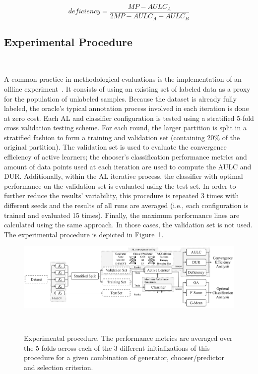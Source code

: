 \documentclass[parskip=full]{scrartcl}
\begin{document}
\begin{equation}
    deficiency = \frac{MP-AULC_A}{2MP-AULC_A-AULC_B} 
\end{equation}

\subsection{Experimental Procedure}~\label{sec:experimental_procedure}

A common practice in methodological evaluations is the implementation of an
offline experiment~\cite{Kagy2019}. It consists of using an existing set of
labeled data as a proxy for the population of unlabeled samples. Because the
dataset is already fully labeled, the oracle's typical annotation process
involved in each iteration is done at zero cost. Each AL and classifier
configuration is tested using a stratified 5-fold cross validation testing
scheme. For each round, the larger partition is split in a stratified fashion to
form a training and validation set (containing 20\% of the original partition).
The validation set is used to evaluate the convergence efficiency of active
learners; the chooser's classification performance metrics and amount of data
points used at each iteration are used to compute the AULC and DUR\@.
Additionally, within the AL iterative process, the classifier with optimal
performance on the validation set is evaluated using the test set. In order to
further reduce the results' variability, this procedure is repeated 3 times with
different seeds and the results of all runs are averaged (i.e., each
configuration is trained and evaluated 15 times). Finally, the maximum
performance lines are calculated using the same approach. In those cases, the
validation set is not used. The experimental procedure is depicted in
Figure~\ref{fig:experiment_pipeline}.

\begin{figure}[H]
	\centering
	\includegraphics[width=1\linewidth]{../analysis/experiment_pipeline}
	\caption{Experimental procedure. The performance metrics are averaged over
    the 5 folds across each of the 3 different initializations of this procedure
    for a given combination of generator, chooser/predictor and selection
    criterion.}~\label{fig:experiment_pipeline}
\end{figure}
\end{document}
